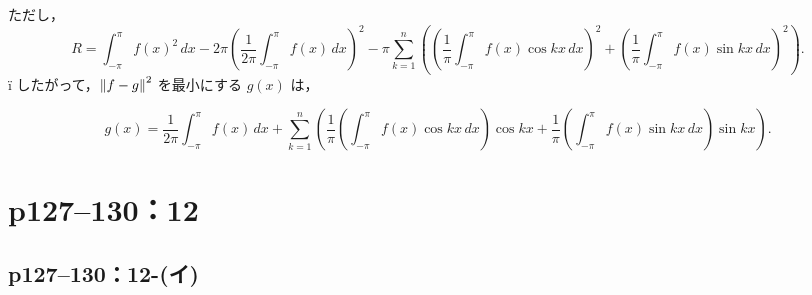\documentclass[a4paper,10pt,fleqn]{ltjsarticle}
\begin{document}
\begin{tleftbar}
  ただし，
  \[
    R= \int_{-\pi}^{\pi} f(x)^2 \, dx - 2\pi \left( \frac{1}{2\pi} \int_{-\pi}^{\pi} f(x) \, dx \right)^2 - \pi \sum_{k=1}^{n} \left( \left( \frac{1}{\pi} \int_{-\pi}^{\pi} f(x) \cos kx \, dx \right)^2 + \left( \frac{1}{\pi} \int_{-\pi}^{\pi} f(x) \sin kx \, dx \right)^2 \right).
  \]
  ï
  したがって，$\norm{f - g}^2$ を最小にする $g(x)$ は，

  \[
    g(x) = \frac{1}{2\pi} \int_{-\pi}^{\pi} f(x) \, dx + \sum_{k=1}^{n} \left(\frac{1}{\pi}  \left(\int_{-\pi}^{\pi} f(x) \cos kx \, dx \right) \cos kx + \frac{1}{\pi} \left(\int_{-\pi}^{\pi} f(x) \sin kx\,  dx \right) \sin kx \right).
  \]
\end{tleftbar}

\newpage


\section*{p127--130：12}


\subsection*{p127--130：12-(イ)}
\end{document}
